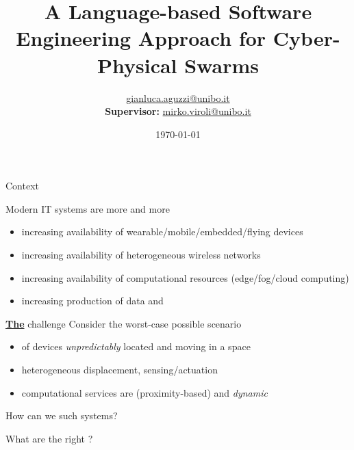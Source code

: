 \documentclass[presentation, 9pt,169]{beamer}\mode<presentation>{\usetheme{AMSBolognaFC}}
\title[A Soft-Eng Approach for CPSWs!]
{A Language-based Software Engineering Approach for Cyber-Physical Swarms}
\author[\sspeaker{G.Aguzzi}]
{\speaker{Gianluca Aguzzi} \href{mailto:gianluca.aguzzi@unibo.it}{gianluca.aguzzi@unibo.it} \\
\textbf{Supervisor:} \speaker{Mirko Viroli} \href{mailto:mirko.viroli@unibo.it}{mirko.viroli@unibo.it}}
\institute[DISI, Univ.\ Bologna]
{%
\textsc{Alma Mater Studiorum} -- Universit{\`a} di Bologna \\[0.1cm]
\textbf{PhD defense}\\[0.15cm]
}
\date[\today]{\today}
\begin{document}

\frame{\titlepage}

\section*{\refname}

\begin{frame}{Context}\label{context:start}
  \begin{exampleblock}{Modern IT systems are more and more }
    \begin{itemize}
      \item increasing availability of wearable/mobile/embedded/flying devices
      \item increasing availability of heterogeneous wireless networks
      \item increasing availability of computational resources (edge/fog/cloud computing)
      \item increasing production of data  and 
    \end{itemize}
  \end{exampleblock}
  \begin{alertblock}{\underline{\textbf{The}} challenge}
    Consider the worst-case possible scenario
    \begin{itemize}
      \item {} of devices \emph{unpredictably} located and moving in a space
      \item heterogeneous displacement,  sensing/actuation
      \item computational services are  (proximity-based) and \emph{dynamic} 
    \end{itemize}
  \end{alertblock}
  \begin{center}
  \Large{How can we  such systems?}
  \end{center}
  \begin{center}
    \Large{What are the right ?}
    \end{center}
  \end{frame}
\end{document}
